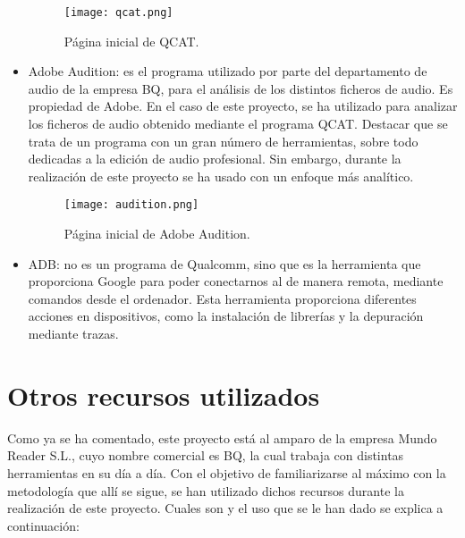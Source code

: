 \begin{itemize}
\begin{figure}[H]
		\centering
		\texttt{[image: qcat.png]}
		\caption{Página inicial de QCAT.}
		\label{fig:qcat}
	\end{figure}	
	\item{Adobe Audition: es el programa utilizado por parte del departamento de audio de la empresa BQ, para el análisis de los distintos ficheros de audio. Es propiedad de Adobe. En el caso de este proyecto, se ha utilizado para analizar los ficheros de audio obtenido mediante el programa \gls{QCAT}. Destacar que se trata de un programa con un gran número de herramientas, sobre todo dedicadas a la edición de audio profesional. Sin embargo, durante la realización de este proyecto se ha usado con un enfoque más analítico.}
	\begin{figure}[H]
		\centering
		\texttt{[image: audition.png]}
		\caption{Página inicial de Adobe Audition.}
		\label{fig:audition}
	\end{figure}	
	\item{\gls{ADB}: no es un programa de Qualcomm, sino que es la herramienta que proporciona Google para poder conectarnos al de manera remota, mediante comandos desde el ordenador. Esta herramienta proporciona diferentes acciones en dispositivos, como la instalación de librerías y la depuración mediante trazas.}
\end{itemize}

\section{Otros recursos utilizados}
Como ya se ha comentado, este proyecto está al amparo de la empresa Mundo Reader S.L., cuyo nombre comercial es BQ, la cual trabaja con distintas herramientas en su día a día. Con el objetivo de familiarizarse al máximo con la metodología que allí se sigue, se han utilizado dichos recursos durante la realización de este proyecto. Cuales son y el uso que se le han dado se explica a continuación:


